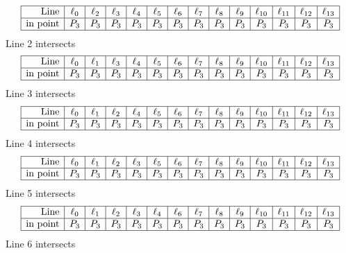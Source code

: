 \documentclass{article}
\begin{document}
{$$\begin{array}{|r*{13}{|c}|}
\hline
\mbox{Line}  & \ell_{0} & \ell_{2} & \ell_{3} & \ell_{4} & \ell_{5} & \ell_{6} & \ell_{7} & \ell_{8} & \ell_{9} & \ell_{10} & \ell_{11} & \ell_{12} & \ell_{13}\\
\hline
\mbox{in point}  & P_{3} & P_{3} & P_{3} & P_{3} & P_{3} & P_{3} & P_{3} & P_{3} & P_{3} & P_{3} & P_{3} & P_{3} & P_{3}\\
\hline
\end{array}
$$
Line 2 intersects 
$$
\begin{array}{|r*{13}{|c}|}
\hline
\mbox{Line}  & \ell_{0} & \ell_{1} & \ell_{3} & \ell_{4} & \ell_{5} & \ell_{6} & \ell_{7} & \ell_{8} & \ell_{9} & \ell_{10} & \ell_{11} & \ell_{12} & \ell_{13}\\
\hline
\mbox{in point}  & P_{3} & P_{3} & P_{3} & P_{3} & P_{3} & P_{3} & P_{3} & P_{3} & P_{3} & P_{3} & P_{3} & P_{3} & P_{3}\\
\hline
\end{array}
$$
Line 3 intersects 
$$
\begin{array}{|r*{13}{|c}|}
\hline
\mbox{Line}  & \ell_{0} & \ell_{1} & \ell_{2} & \ell_{4} & \ell_{5} & \ell_{6} & \ell_{7} & \ell_{8} & \ell_{9} & \ell_{10} & \ell_{11} & \ell_{12} & \ell_{13}\\
\hline
\mbox{in point}  & P_{3} & P_{3} & P_{3} & P_{3} & P_{3} & P_{3} & P_{3} & P_{3} & P_{3} & P_{3} & P_{3} & P_{3} & P_{3}\\
\hline
\end{array}
$$
Line 4 intersects 
$$
\begin{array}{|r*{13}{|c}|}
\hline
\mbox{Line}  & \ell_{0} & \ell_{1} & \ell_{2} & \ell_{3} & \ell_{5} & \ell_{6} & \ell_{7} & \ell_{8} & \ell_{9} & \ell_{10} & \ell_{11} & \ell_{12} & \ell_{13}\\
\hline
\mbox{in point}  & P_{3} & P_{3} & P_{3} & P_{3} & P_{3} & P_{3} & P_{3} & P_{3} & P_{3} & P_{3} & P_{3} & P_{3} & P_{3}\\
\hline
\end{array}
$$
Line 5 intersects 
$$
\begin{array}{|r*{13}{|c}|}
\hline
\mbox{Line}  & \ell_{0} & \ell_{1} & \ell_{2} & \ell_{3} & \ell_{4} & \ell_{6} & \ell_{7} & \ell_{8} & \ell_{9} & \ell_{10} & \ell_{11} & \ell_{12} & \ell_{13}\\
\hline
\mbox{in point}  & P_{3} & P_{3} & P_{3} & P_{3} & P_{3} & P_{3} & P_{3} & P_{3} & P_{3} & P_{3} & P_{3} & P_{3} & P_{3}\\
\hline
\end{array}
$$
Line 6 intersects 
$$
\begin{array}{|r*{13}{|c}|}

\end{array}$$}
\end{document}

